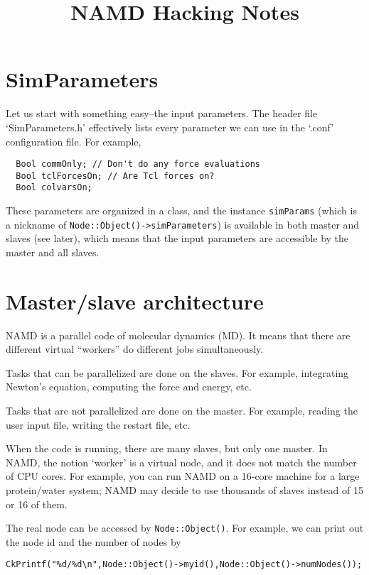 \documentclass{article}
\begin{document}
\title{NAMD Hacking Notes}
\author{ \vspace{-10ex} }
\date{ \vspace{-10ex} }


\maketitle

\tableofcontents


\section{SimParameters}

Let us start with something easy--the input parameters.
%
The header file `SimParameters.h' effectively
lists every parameter we can use in the `.conf' configuration file.
%
For example,
\begin{lstlisting}
  Bool commOnly; // Don't do any force evaluations
  Bool tclForcesOn; // Are Tcl forces on?
  Bool colvarsOn;
\end{lstlisting}
%
These parameters are organized in a class,
and the instance \texttt{simParams}
(which is a nickname of \texttt{Node::Object()->simParameters})
is available in both master and slaves (see later),
which means that the input parameters are accessible
by the master and all slaves.


\section{Master/slave architecture}

NAMD is a parallel code of molecular dynamics (MD).
%
It means that there are different virtual ``workers''
do different jobs simultaneously.

Tasks that can be parallelized are done on the slaves.
%
For example, integrating Newton's equation, computing the force and energy, etc.

Tasks that are not parallelized are done on the master.
%
For example, reading the user input file,
writing the restart file, etc.

When the code is running, there are many slaves,
but only one master.
%
In NAMD, the notion `worker' is a virtual node,
and it does not match the number of CPU cores.
%
For example, you can run NAMD on a 16-core machine
for a large protein/water system;
NAMD may decide to use thousands of slaves
instead of 15 or 16 of them.

The real node can be accessed by \texttt{Node::Object()}.
%
For example, we can print out the node id and the number of nodes by
\begin{lstlisting}
CkPrintf("%d/%d\n",Node::Object()->myid(),Node::Object()->numNodes());
\end{lstlisting}
\end{document}
